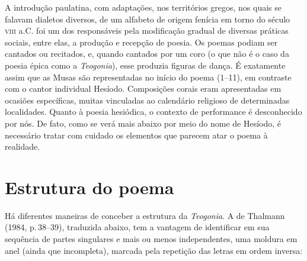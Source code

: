 A introdução paulatina, com adaptações, nos territórios gregos, nos
quais se falavam dialetos diversos, de um alfabeto de origem fenícia em
torno do século \textsc{viii} a.C. foi um dos responsáveis pela modificação
gradual de diversas práticas sociais, entre elas, a produção e recepção
de poesia. Os poemas podiam ser cantados ou recitados, e, quando
cantados por um coro (o que não é o caso da poesia épica como a
\textit{Teogonia}), esse produzia figuras de dança. É exatamente assim que
as Musas são representadas no início do poema (1--11), em contraste com o
cantor individual Hesíodo. Composições corais eram apresentadas em
ocasiões específicas, muitas vinculadas ao calendário religioso de
determinadas localidades. Quanto à poesia hesiódica, o contexto de
performance é desconhecido por nós. De fato, como se verá mais abaixo
por meio do nome de Hesíodo, é necessário tratar com cuidado os
elementos que parecem atar o poema à realidade.

\section{Estrutura do poema}

Há diferentes maneiras de conceber a estrutura da \textit{Teogonia}. A de
Thalmann (1984, p.\,38--39), traduzida abaixo, tem a vantagem de
identificar em sua sequência de partes singulares e mais ou menos
independentes, uma moldura em anel (ainda que incompleta), marcada pela
repetição das letras em ordem inversa:

